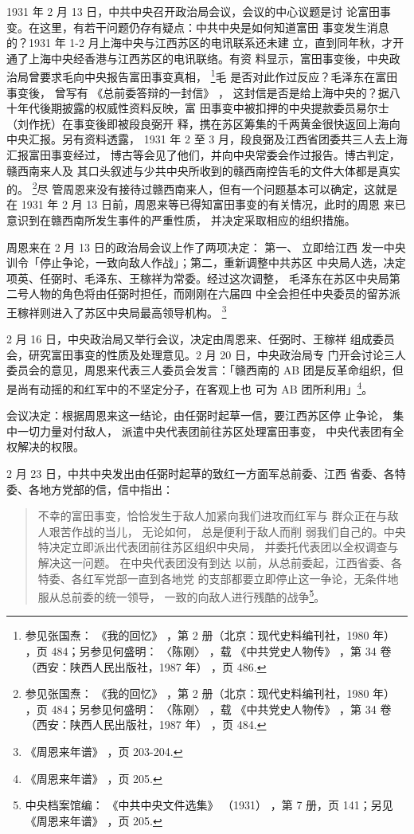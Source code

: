1931 年 2 月 13 日，中共中央召开政治局会议，会议的中心议题是讨
论富田事变。在这里，有若干问题仍存有疑点：中共中央是如何知道富田
事变发生消息的？1931 年 1-2 月上海中央与江西苏区的电讯联系还未建
立，直到同年秋，才开通了上海中央经香港与江西苏区的电讯联络。有资
料显示，富田事变後，中央政治局曾要求毛向中央报告富田事变真相，
\footnote{ 参见张国焘：
《我的回忆》
，第 2 册（北京：现代史料编刊社，1980 年）
，页 484；另参见何盛明：
〈陈刚〉
，载
《中共党史人物传》
，第 34 卷（西安：陕西人民出版社，1987 年）
，页 486.}毛
是否对此作过反应？毛泽东在富田事变後，
曾写有
《总前委答辩的一封信》
，
这封信是否是给上海中央的？据八十年代後期披露的权威性资料反映，富
田事变中被扣押的中央提款委员易尔士（刘作抚）在事变後即被段良弼开
释，携在苏区筹集的千两黄金很快返回上海向中央汇报。另有资料透露，
1931 年 2 至 3 月，段良弼及江西省团委共三人去上海汇报富田事变经过，
博古等会见了他们，并向中央常委会作过报告。博古判定，赣西南来人及
其口头叙述与少共中央所收到的赣西南控告毛的文件大体都是真实的。
\footnote{ 参见张国焘：
《我的回忆》
，第 2 册（北京：现代史料编刊社，1980 年）
，页 484；另参见何盛明：
〈陈刚〉
，载
《中共党史人物传》
，第 34 卷（西安：陕西人民出版社，1987 年）
，页 484.}尽
管周恩来没有接待过赣西南来人，但有一个问题基本可以确定，这就是在
1931 年 2 月 13 日前，周恩来等已得知富田事变的有关情况，此时的周恩
来已意识到在赣西南所发生事件的严重性质，
并决定采取相应的组织措施。

周恩来在 2 月 13 日的政治局会议上作了两项决定：
第一、
立即给江西
发一中央训令「停止争论，一致向敌人作战」；第二，重新调整中共苏区
中央局人选，决定项英、任弼时、毛泽东、王稼祥为常委。经过这次调整，
毛泽东在苏区中央局第二号人物的角色将由任弼时担任，而刚刚在六届四
中全会担任中央委员的留苏派王稼祥则进入了苏区中央局最高领导机构。
\footnote{ 《周恩来年谱》
，页 203-204.}
 

   2 月 16 日，中央政治局又举行会议，决定由周恩来、任弼时、王稼祥
组成委员会，研究富田事变的性质及处理意见。2 月 20 日，中央政治局专
门开会讨论三人委员会的意见，周恩来代表三人委员会发言：「赣西南的
AB 团是反革命组织，但是尚有动摇的和红军中的不坚定分子，在客观上也
可为 AB 团所利用」\footnote{《周恩来年谱》
，页 205.}。

会议决定：根据周恩来这一结论，由任弼时起草一信，要江西苏区停
止争论，
集中一切力量对付敌人，
派遣中央代表团前往苏区处理富田事变，
中央代表团有全权解决的权限。

2 月 23 日，中共中央发出由任弼时起草的致红一方面军总前委、江西
省委、各特委、各地方党部的信，信中指出：
\begin{quote}
	\fzwkai 不幸的富田事变，恰恰发生于敌人加紧向我们进攻而红军与
群众正在与敌人艰苦作战的当儿，
无论如何，
总是便利于敌人而削
弱我们自己的。中央特决定立即派出代表团前往苏区组织中央局，
并委托代表团以全权调查与解决这一问题。
在中央代表团没有到达
以前，从总前委起，江西省委、各特委、各红军党部一直到各地党
的支部都要立即停止这一争论，无条件地服从总前委的统一领导，
一致的向敌人进行残酷的战争\footnote{ 中央档案馆编：
《中共中央文件选集》
（1931）
，第 7 册，页 141；另见《周恩来年谱》
，页 205.}。
\end{quote}

